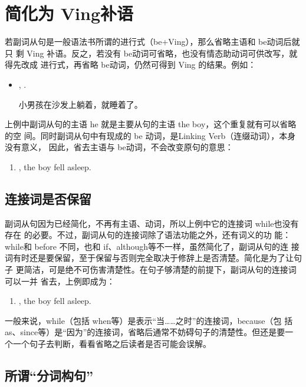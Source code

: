 \section{简化为 Ving补语}

若副词从句是一般语法书所谓的进行式（be+Ving），那么省略主语和 be动词后就只
剩 Ving 补语。反之，若没有 be动词可省略，也没有情态助动词可供改写，就得先改成
进行式，再省略 be动词，仍然可得到 Ving 的结果。例如：

\begin{itemize}
\item {},   .

  小男孩在沙发上躺着，就睡着了。
\end{itemize}
上例中副词从句的主语 he 就是主要从句的主语 the boy，这个重复就有可以省略的空
间。同时副词从句中有现成的 be 动词，是Linking Verb（连缀动词），本身没有意义，
因此，省去主语与 be动词，不会改变原句的意思：
\begin{enumerate}
\item {}, the boy fell asleep.
\end{enumerate}

\subsection{连接词是否保留}

副词从句因为已经简化，不再有主语、动词，所以上例中它的连接词 while也没有存在
的必要。不过，副词从句的连接词除了语法功能之外，还有词义的功
能：while和 before 不同，也和 if、although等不一样，虽然简化了，副词从句的连
接词有时还是要保留，至于保留与否则完全取决于修辞上是否清楚。简化是为了让句子
更简洁，可是绝不可伤害清楚性。在句子够清楚的前提下，副词从句的连接词可以一并
省去，上例即成为：
\begin{enumerate}[resume]
\item {}, the boy fell asleep.
\end{enumerate}

一般来说，while（包括 when等）是表示“当……之时”的连接词，because（包
括 as、since等）是“因为”的连接词，省略后通常不妨碍句子的清楚性。但还是要一
个一个句子去判断，看看省略之后读者是否可能会误解。

\subsection{所谓“分词构句”}

